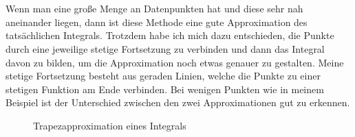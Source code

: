 \documentclass[a4paper,12pt]{article}
\theoremstyle{definition}
\theoremstyle{remark}
\begin{document}
\\ \\
Wenn man eine große Menge an Datenpunkten hat und diese sehr nah aneinander liegen, dann ist 
diese Methode eine gute Approximation des tatsächlichen Integrals. Trotzdem habe ich mich dazu entschieden, 
die Punkte durch eine jeweilige stetige Fortsetzung zu verbinden und dann das Integral davon zu 
bilden, um die Approximation noch etwas genauer zu gestalten. Meine stetige Fortsetzung besteht aus 
geraden Linien, welche die Punkte zu einer stetigen Funktion am Ende verbinden. Bei wenigen Punkten 
wie in meinem Beispiel ist der Unterschied zwischen den zwei Approximationen gut zu erkennen.
\begin{figure}[H]
\centering
{}
\caption{Trapezapproximation eines Integrals}
\end{figure}
\end{document}
